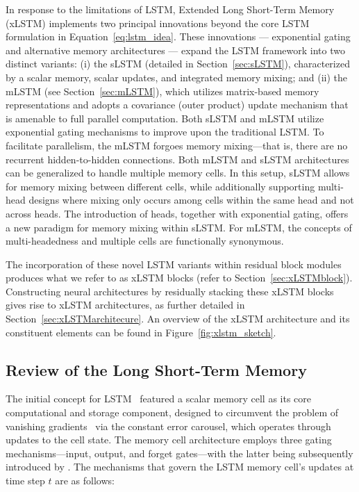 In response to the limitations of LSTM, Extended Long Short-Term Memory (xLSTM) implements two principal innovations beyond the core LSTM formulation in Equation~\eqref{eq:lstm_idea}. These innovations — exponential gating and alternative memory architectures — expand the LSTM framework into two distinct variants: (i) the sLSTM (detailed in Section~\ref{sec:sLSTM}), characterized by a scalar memory, scalar updates, and integrated memory mixing; and (ii) the mLSTM (see Section~\ref{sec:mLSTM}), which utilizes matrix-based memory representations and adopts a covariance (outer product) update mechanism that is amenable to full parallel computation. Both sLSTM and mLSTM utilize exponential gating mechanisms to improve upon the traditional LSTM. To facilitate parallelism, the mLSTM forgoes memory mixing—that is, there are no recurrent hidden-to-hidden connections. Both mLSTM and sLSTM architectures can be generalized to handle multiple memory cells. In this setup, sLSTM allows for memory mixing between different cells, while additionally supporting multi-head designs where mixing only occurs among cells within the same head and not across heads. The introduction of heads, together with exponential gating, offers a new paradigm for memory mixing within sLSTM. For mLSTM, the concepts of multi-headedness and multiple cells are functionally synonymous.

The incorporation of these novel LSTM variants within residual block modules produces what we refer to as xLSTM blocks (refer to Section~\ref{sec:xLSTMblock}). Constructing neural architectures by residually stacking these xLSTM blocks gives rise to xLSTM architectures, as further detailed in Section~\ref{sec:xLSTMarchitecure}. An overview of the xLSTM architecture and its constituent elements can be found in Figure~\ref{fig:xlstm_sketch}.

\subsection{Review of the Long Short-Term Memory}
\label{sec:orgLSTM}

The initial concept for LSTM~\citep{Hochreiter:91,Hochreiter:97nips,Hochreiter:97} featured a scalar memory cell as its core computational and storage component, designed to circumvent the problem of vanishing gradients~\citep{Hochreiter:91,Hochreiter:00book} via the constant error carousel, which operates through updates to the cell state. The memory cell architecture employs three gating mechanisms—input, output, and forget gates—with the latter being subsequently introduced by \citet{Gers:00}. The mechanisms that govern the LSTM memory cell's updates at time step $t$ are as follows:

